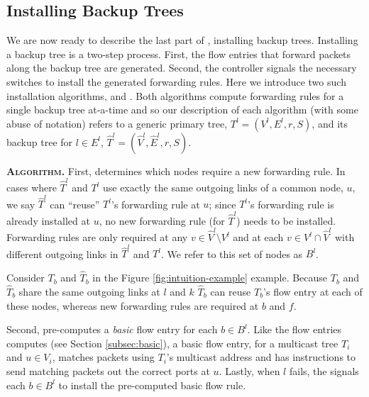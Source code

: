 

\subsection{Installing Backup Trees}
\label{subsec:install-backups}

We are now ready to describe the last part of \mdrs, installing backup trees.  %
Installing a backup tree is a two-step process. First, the flow entries that forward packets along the backup tree are generated.  Second, the 
controller signals the necessary switches to install the generated forwarding rules.  Here we introduce two such installation algorithms, \pre and \posts.
Both algorithms compute forwarding rules for a single backup tree at-a-time and so
our description of each algorithm (with some abuse of notation) refers to a generic primary tree, $T^l = (V^l,E^l,r,S)$, and its backup tree for $l \in E^l$, $\hat{T}^l=(\hat{V}^l,\hat{E}^l,r,S)$.  

{\bf \post \textsc{Algorithm.}}
First, \post determines which nodes require a new forwarding rule. %
 In cases where $\hat{T}^l$ and $T^l$ use exactly the same outgoing links of a common node, $u$, we say
$\hat{T}^l$ can ``reuse'' $T^l$'s forwarding rule at $u$;  since $T^l$'s forwarding rule is already installed at $u$, no new forwarding rule (for $\hat{T}^l$) needs to be installed. %
Forwarding rules are only required at any $v \in \hat{V}^l \setminus V^l$ and at each $v \in V^l \cap \hat{V}^l$ with different outgoing links in $\hat{T}^l$ and $T^l$.  We refer to this
set of nodes as $B^l$. 

Consider $T_b$ and $\hat{T}_b$ in the Figure \ref{fig:intuition-example} example. Because $T_b$ and $\hat{T}_b$  share the same outgoing links at $l$ and $k$
$\hat{T}_b$ can reuse $T_b$'s flow entry at each of these nodes, whereas new forwarding rules are required at $b$ and $f$.

Second, \post pre-computes a \emph{basic} flow entry for each $b \in B^l$.  Like the flow entries \base computes (see Section \ref{subsec:basic}), a basic flow
entry, for a multicast tree $T_i$ and $u \in V_i$, matches packets using $T_i$'s multicast address and has instructions to send matching packets out the correct ports at $u$. 
Lastly, when $l$ fails, the \post signals each $b \in B^l$ to install the pre-computed basic flow rule.


